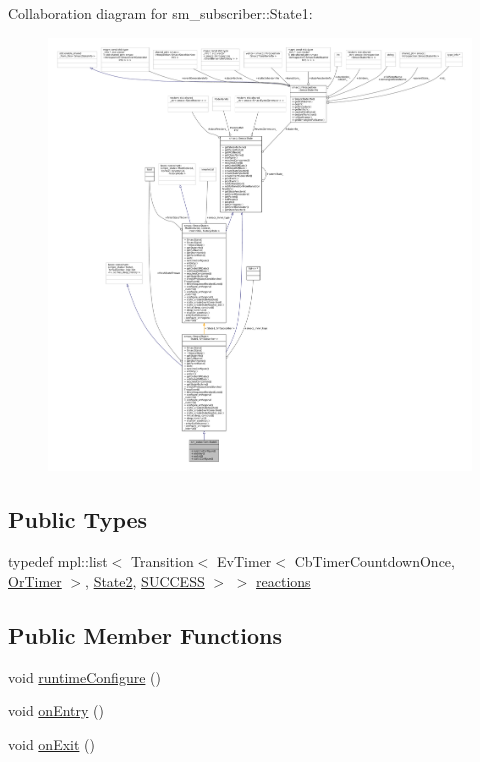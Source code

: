 Collaboration diagram for sm\+\_\+subscriber\+:\+:State1\+:
\nopagebreak
\begin{figure}[H]
\begin{center}
\leavevmode
\includegraphics[width=350pt]{structsm__subscriber_1_1State1__coll__graph}
\end{center}
\end{figure}
\subsection*{Public Types}
\begin{DoxyCompactItemize}
\item 
typedef mpl\+::list$<$ Transition$<$ Ev\+Timer$<$ Cb\+Timer\+Countdown\+Once, \hyperlink{classsm__subscriber_1_1OrTimer}{Or\+Timer} $>$, \hyperlink{structsm__subscriber_1_1State2}{State2}, \hyperlink{structsmacc_1_1default__transition__tags_1_1SUCCESS}{S\+U\+C\+C\+E\+SS} $>$ $>$ \hyperlink{structsm__subscriber_1_1State1_afb6efba4aeabaa5423876c725b4c2e70}{reactions}
\end{DoxyCompactItemize}
\subsection*{Public Member Functions}
\begin{DoxyCompactItemize}
\item 
void \hyperlink{structsm__subscriber_1_1State1_a53ed360656c26531101bda2397f8c024}{runtime\+Configure} ()
\item 
void \hyperlink{structsm__subscriber_1_1State1_a20fcc20aab6ea52a463e3b275585bafb}{on\+Entry} ()
\item 
void \hyperlink{structsm__subscriber_1_1State1_a539b0ab5ba62c8b2298c1efc678c6683}{on\+Exit} ()
\end{DoxyCompactItemize}
